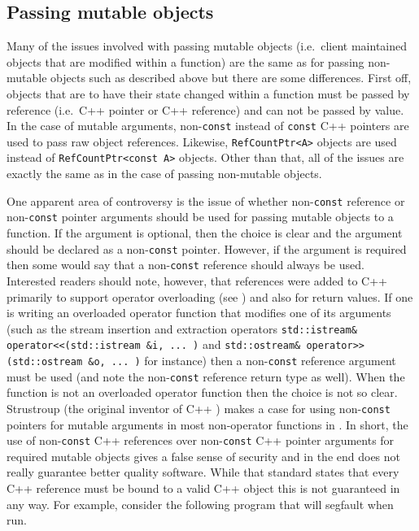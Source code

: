 %
\subsection{Passing mutable objects}
%

Many of the issues involved with passing mutable objects (i.e.~client
maintained objects that are modified within a function) are the same as
for passing non-mutable objects such as described above but there are
some differences.  First off, objects that are to have their state
changed within a function must be passed by reference (i.e.~C++
pointer or C++ reference) and can not be passed by value.  In the case
of mutable arguments, non-{}\texttt{const} instead of {}\texttt{const}
C++ pointers are used to pass raw object references.  Likewise,
{}\texttt{Ref\-Count\-Ptr<A>} objects are used instead of
{}\texttt{Ref\-Count\-Ptr<const A>} objects.  Other than that, all of
the issues are exactly the same as in the case of passing non-mutable
objects.

One apparent area of controversy is the issue of whether
non-\texttt{const} reference or non-\texttt{const} pointer arguments
should be used for passing mutable objects to a function.  If the
argument is optional, then the choice is clear and the argument should
be declared as a non-\texttt{const} pointer.  However, if the argument
is required then some would say that a non-\texttt{const} reference
should always be used.  Interested readers should note, however, that
references were added to C++ primarily to support operator overloading
(see {}\cite[Section 3.7]{ref:design_evol_cpp}) and also for return
values.  If one is writing an overloaded operator function that
modifies one of its arguments (such as the stream insertion and
extraction operators {}\texttt{std::istream\& operator<<(std::istream
\&i, ... )} and {}\texttt{std::ostream\& operator>>(std::ostream \&o,
... )} for instance) then a non-\texttt{const} reference argument must
be used (and note the non-\texttt{const} reference return type as
well).  When the function is not an overloaded operator function then
the choice is not so clear.  Strustroup (the original inventor of C++
{}\cite{ref:design_evol_cpp}) makes a case for using
non-\texttt{const} pointers for mutable arguments in most non-operator
functions in {}\cite[Section 5.5]{ref:stroustrup_2000}.  In short, the
use of non-{}\texttt{const} C++ references over non-{}\texttt{const}
C++ pointer arguments for required mutable objects gives a false sense
of security and in the end does not really guarantee better quality
software.  While that standard states that every C++ reference must be
bound to a valid C++ object this is not guaranteed in any way.  For example,
consider the following program that will segfault when run.

